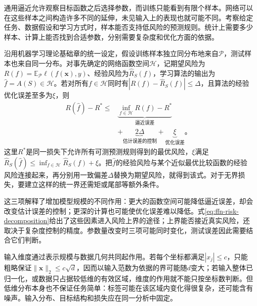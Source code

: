 通用逼近允许观察目标函数之后选择参数，而训练只能看到有限个样本。网络可以在这些样本之间构造许多不同的延伸，未见输入上的表现也就可能不同。考察给定任务、数据假设和学习方式时，样本能否支持低风险的预测规则。统计上需要多少样本、计算上能否找到合适参数，分别需要复杂度和优化方面的依据。

沿用机器学习理论基础章的统一设定，假设训练样本独立同分布地来自$\mathcal{P}$，测试样本也来自同一分布。对事先确定的网络函数空间$\mathcal{H}$，记期望风险为$R(f)=\mathbb{E}_{\mathcal{P}}\ell(f(\bm{x}),y)$、经验风险为$\widehat R_S(f)$，学习算法的输出为$\widehat f=A(S)\in\mathcal{H}$。若对所有$f\in\mathcal{H}$同时有$|R(f)-\widehat R_S(f)|\leq\Delta$，且算法的经验优化误差至多为$\xi$，则
\begin{equation}
  \begin{aligned}
    R(\widehat f)-R^*\leq{}&
    \underbrace{\inf_{f\in\mathcal{H}}R(f)-R^*}_{\text{逼近误差}}\\
    &+\underbrace{2\Delta}_{\text{估计误差的控制}}
    +\underbrace{\xi}_{\text{优化误差}}\text{。}
  \end{aligned}
  \label{eq:ffn-risk-decomposition}
\end{equation}
这里$R^*$是同一损失下允许所有可测预测规则得到的最优风险，$\xi$满足$\widehat R_S(\widehat f)\leq\inf_{f\in\mathcal{H}}\widehat R_S(f)+\xi$。把$\widehat f$的经验风险与某个近似最优比较函数的经验风险连接起来，再分别用一致偏差$\Delta$替换为期望风险，就得到该式。对于无界损失，要建立这样的统一界还需矩或尾部等额外条件。

这三项解释了增加模型规模的不同作用：更大的函数空间可能降低逼近误差，却会改变估计误差的控制；更深的计算也可能使优化误差难以降低。式\eqref{eq:ffn-risk-decomposition}给出了这些因素进入风险上界的途径；上界能否接近真实风险，还取决于复杂度控制的精度。参数量改变时三项可能同时变化，测试误差因此需要结合它们判断。

输入维度通过表示规模与数据几何共同起作用。若每个坐标都满足$|x_j|\leq c$，只能粗略保证$\lVert\bm{x}\rVert_2\leq c\sqrt d$，因而以输入范数为依据的界可能随$d$变大；若输入整体已归一化，或数据只占据较低维的有效区域，维度的作用就不能只按坐标数判断。但低维分布本身也不保证任务简单：标签可能在该区域内变化得很复杂，还可能含有噪声。输入分布、目标结构和损失应在同一分析中固定。

